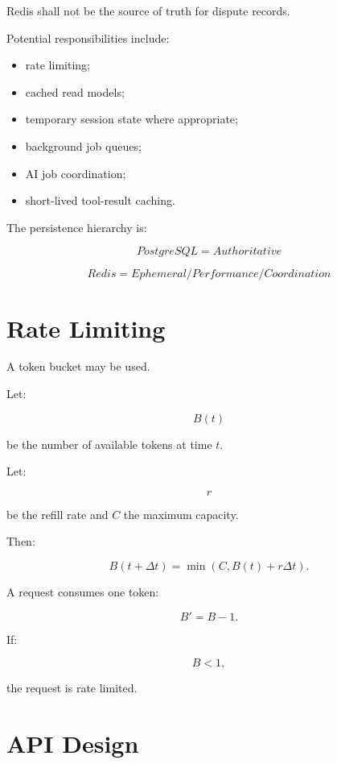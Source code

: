 \documentclass[11pt,a4paper]{article}
\begin{document}
Redis shall not be the source of truth for dispute records.

Potential responsibilities include:

\begin{itemize}
    \item rate limiting;
    \item cached read models;
    \item temporary session state where appropriate;
    \item background job queues;
    \item AI job coordination;
    \item short-lived tool-result caching.
\end{itemize}

The persistence hierarchy is:

\[
\boxed{
PostgreSQL = Authoritative
}
\]

\[
\boxed{
Redis = Ephemeral / Performance / Coordination
}
\]

\section{Rate Limiting}

A token bucket may be used.

Let:

\[
B(t)
\]

be the number of available tokens at time \(t\).

Let:

\[
r
\]

be the refill rate and \(C\) the maximum capacity.

Then:

\[
B(t+\Delta t)
=
\min
\left(
C,
B(t)+r\Delta t
\right).
\]

A request consumes one token:

\[
B' = B-1.
\]

If:

\[
B<1,
\]

the request is rate limited.

\section{API Design}
\end{document}
